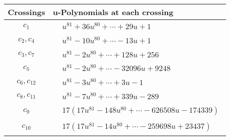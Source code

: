 \documentclass[1p]{elsarticle_modified}
\theoremstyle{definition}
\begin{document}
\begin{tabular}{m{50pt}|m{274pt}}
Crossings & \hspace{64pt}u-Polynomials at each crossing \\
\hline $$\begin{aligned}c_{1}\end{aligned}$$&$\begin{aligned}
&u^{81}+36 u^{80}+\cdots+29 u+1
\end{aligned}$\\
\hline $$\begin{aligned}c_{2},c_{4}\end{aligned}$$&$\begin{aligned}
&u^{81}-10 u^{80}+\cdots-13 u+1
\end{aligned}$\\
\hline $$\begin{aligned}c_{3},c_{7}\end{aligned}$$&$\begin{aligned}
&u^{81}-2 u^{80}+\cdots+128 u+256
\end{aligned}$\\
\hline $$\begin{aligned}c_{5}\end{aligned}$$&$\begin{aligned}
&u^{81}-2 u^{80}+\cdots-32096 u+9248
\end{aligned}$\\
\hline $$\begin{aligned}c_{6},c_{12}\end{aligned}$$&$\begin{aligned}
&u^{81}-3 u^{80}+\cdots+3 u-1
\end{aligned}$\\
\hline $$\begin{aligned}c_{8},c_{11}\end{aligned}$$&$\begin{aligned}
&u^{81}-7 u^{80}+\cdots+339 u-289
\end{aligned}$\\
\hline $$\begin{aligned}c_{9}\end{aligned}$$&$\begin{aligned}
&17(17 u^{81}-148 u^{80}+\cdots-626508 u-174339)
\end{aligned}$\\
\hline $$\begin{aligned}c_{10}\end{aligned}$$&$\begin{aligned}
&17(17 u^{81}-14 u^{80}+\cdots-259698 u+23437)
\end{aligned}$\\
\hline
\end{tabular}\\~\\
\end{document}
